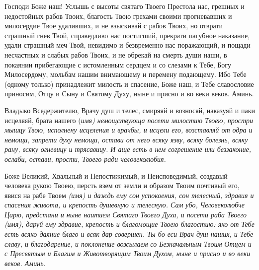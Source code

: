 \mychapterending

 




Господи Боже наш! Услышь с высоты святаго Твоего Престола нас, грешных и недостойных рабов Твоих, благость Твою грехами своими прогневавших и милосердие Твое удаливших, и не взыскивай с рабов Твоих, но отврати страшный гнев Твой, справедливо нас постигший, прекрати пагубное наказание, удали страшный меч Твой, невидимо и безвременно нас поражающий, и пощади несчастных и слабых рабов Твоих, и не обрекай на смерть души наши, в покаянии прибегающие с истомленным сердцем и со слезами к Тебе, Богу Милосердому, мольбам нашим внимающему и перемену подающему. Ибо Тебе (одному только) принадлежит милость и спасение, Боже наш, и Тебе славословие приносим, Отцу и Сыну и Святому Духу, ныне и присно и во веки веков. Аминь.





\mychapterending

 


Владыко Вседержителю, Врачу душ и телес, смиряяй и возносяй, наказуяй и паки исцеляяй, брата нашего (\itshape имя\normalfont{}) немощствующа посети милостию Твоею, простри мышцу Твою, исполнену исцеления и врачбы, и исцели его, возставляй от одра и немощи, запрети духу немощи, остави от него всяку язву, всяку болезнь, всяку рану, всяку огневицу и трясавицу. И аще есть в нем согрешение или беззаконие, ослаби, остави, прости, Твоего ради человеколюбия.





\mychapterending

 


Боже Великий, Хвальный и Непостижимый, и Неисповедимый, создавый человека рукою Твоею, персть взем от земли и образом Твоим почтивый его, явися на рабе Твоем \itshape (имя)\normalfont{}  и даждь ему сон успокоения, сон телесный, здравия и спасения живота, и крепость душевную и телесную. Сам убо, Человеколюбче Царю, предстани и ныне наитием Святаго Твоего Духа, и посети раба Твоего \itshape (имя)\normalfont{}, даруй ему здравие, крепость и благомощие Твоею благостию: яко от Тебе есть всяко даяние благо и всяк дар совершен. Ты бо еси Врач душ наших, и Тебе славу, и благодарение, и поклонение возсылаем со Безначальным Твоим Отцем и с Пресвятым и Благим и Животворящим Твоим Духом, ныне и присно и во веки веков. Аминь. 


